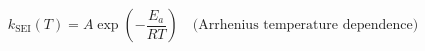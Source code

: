 \documentclass[preview]{standalone}
\begin{document}
\[k_\text{SEI}(T) = A\exp\!\left(-\frac{E_a}{RT}\right) \quad \text{(Arrhenius temperature dependence)} \tag{7.3}\]
\end{document}
